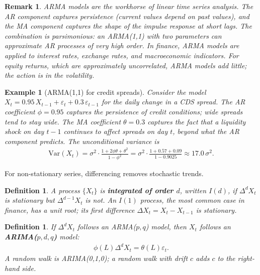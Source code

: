 \documentclass{report}
\theoremstyle{spacedplain}
\theoremstyle{spaceddefinition}
\newtheorem{definition}[theorem]{Definition}
\newtheorem{example}[theorem]{Example}
\theoremstyle{spacedremark}
\newtheorem{remark}[theorem]{Remark}
\begin{document}
\begin{remark}
ARMA models are the workhorse of linear time series analysis. The AR component captures persistence (current values depend on past values), and the MA component captures the shape of the impulse response at short lags. The combination is parsimonious: an ARMA(1,1) with two parameters can approximate AR processes of very high order. In finance, ARMA models are applied to interest rates, exchange rates, and macroeconomic indicators. For equity returns, which are approximately uncorrelated, ARMA models add little; the action is in the volatility.
\end{remark}

\begin{example}[ARMA(1,1) for credit spreads]
Consider the model $X_t = 0.95\, X_{t-1} + \varepsilon_t + 0.3\, \varepsilon_{t-1}$ for the daily change in a CDS spread. The AR coefficient $\phi = 0.95$ captures the persistence of credit conditions; wide spreads tend to stay wide. The MA coefficient $\theta = 0.3$ captures the fact that a liquidity shock on day $t-1$ continues to affect spreads on day $t$, beyond what the AR component predicts. The unconditional variance is
\begin{align}
    \text{Var}(X_t) = \sigma^2 \cdot \frac{1 + 2\phi\theta + \theta^2}{1 - \phi^2} = \sigma^2 \cdot \frac{1 + 0.57 + 0.09}{1 - 0.9025} \approx 17.0\, \sigma^2.
\end{align}

\end{example}

For non-stationary series, differencing removes stochastic trends.

\begin{definition}
A process $\{X_t\}$ is \textbf{integrated of order $d$}, written $I(d)$, if $\Delta^d X_t$ is stationary but $\Delta^{d-1} X_t$ is not. An $I(1)$ process, the most common case in finance, has a unit root; its first difference $\Delta X_t = X_t - X_{t-1}$ is stationary.
\end{definition}

\begin{definition}
If $\Delta^d X_t$ follows an ARMA($p,q$) model, then $X_t$ follows an \textbf{ARIMA($p,d,q$)} model:
\begin{align}
    \phi(L)\Delta^d X_t = \theta(L)\varepsilon_t.
\end{align}
A random walk is ARIMA(0,1,0); a random walk with drift $c$ adds $c$ to the right-hand side.
\end{definition}
\end{document}
